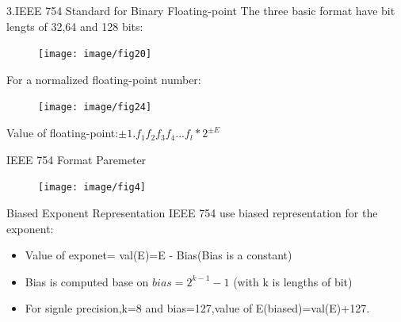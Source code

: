\documentclass[11pt]{beamer}
\begin{document}
\begin{frame}[t]{3.IEEE 754 Standard for Binary Floating-point}
The three basic format have bit lengts of 32,64 and 128 bits:
\begin{center}
    \begin{figure}[htp]
    \begin{center}
     \texttt{[image: image/fig20]}
    \end{center}
    \label{reffig20}
    \end{figure}
\end{center}

For a normalized floating-point number:
\begin{center}
    \begin{figure}[htp]
    \begin{center}
     \texttt{[image: image/fig24]}
    \end{center}
    \label{reffig24}
    \end{figure}
\end{center}
Value of floating-point:$\pm{1.f_1f_2f_3f_4...f_l}*2^{\pm{E}}$\\
\end{frame}
\begin{frame}[t]{IEEE 754 Format Paremeter}
\begin{center}
    \begin{figure}[htp]
    \begin{center}
     \texttt{[image: image/fig4]}
    \end{center}
    \label{reffig4}
    \end{figure}
\end{center}
\end{frame}
\begin{frame}[t]{Biased Exponent Representation}
IEEE 754 use biased representation for the exponent:
\begin{itemize}
\item Value of exponet= val(E)=E - Bias(Bias is a constant)
\item Bias is computed base on $bias=2^{k-1}-1$ (with k is lengths of bit)
\item For signle precision,k=8 and bias=127,value of E(biased)=val(E)+127.
\end{itemize}
\end{frame}
\end{document}
